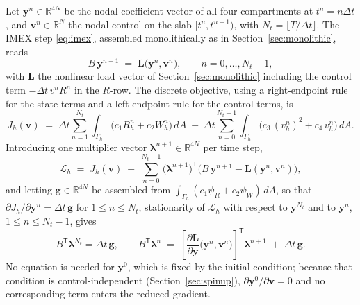 \documentclass[11pt]{article}
\newcommand{\Lag}{\mathcal{L}}
\begin{document}
Let $\mathbf{y}^n\in\mathbb{R}^{4N}$ be the nodal coefficient vector of all four compartments at $t^n=n\Delta t$, and $\mathbf{v}^n\in\mathbb{R}^{N}$ the nodal control on the slab $[t^n,t^{n+1})$, with $N_t = \lfloor T/\Delta t\rfloor$. The IMEX step \eqref{eq:imex}, assembled monolithically as in Section~\ref{sec:monolithic}, reads
\begin{equation}
B\,\mathbf{y}^{n+1} \;=\; \mathbf{L}\big(\mathbf{y}^n,\mathbf{v}^n\big), \qquad n=0,\dots,N_t-1,
\label{eq:discrete-state}
\end{equation}
with $\mathbf{L}$ the nonlinear load vector of Section~\ref{sec:monolithic} including the control term $-\Delta t\,v^n R^n$ in the $R$-row. The discrete objective, using a right-endpoint rule for the state terms and a left-endpoint rule for the control terms, is
\begin{equation}
J_h(\mathbf{v}) \;=\; \Delta t\sum_{n=1}^{N_t}\int_{\Gamma_h}\big(c_1 R_h^n + c_2 W_h^n\big)\,dA
\;+\; \Delta t\sum_{n=0}^{N_t-1}\int_{\Gamma_h} \big(c_3\,(v_h^n)^2 + c_4\,v_h^n\big)\,dA .
\label{eq:discrete-objective}
\end{equation}
Introducing one multiplier vector $\boldsymbol\lambda^{n+1}\in\mathbb{R}^{4N}$ per time step,
\begin{equation}
\Lag_h \;=\; J_h(\mathbf{v}) \;-\; \sum_{n=0}^{N_t-1}\big(\boldsymbol\lambda^{n+1}\big)^{\mathsf T}\Big(B\,\mathbf{y}^{n+1} - \mathbf{L}(\mathbf{y}^n,\mathbf{v}^n)\Big),
\end{equation}
and letting $\mathbf{g}\in\mathbb{R}^{4N}$ be assembled from $\int_{\Gamma_h}(c_1\psi_R + c_2\psi_W)\,dA$, so that $\partial J_h/\partial \mathbf{y}^n = \Delta t\,\mathbf{g}$ for $1\le n\le N_t$, stationarity of $\Lag_h$ with respect to $\mathbf{y}^{N_t}$ and to $\mathbf{y}^{n}$, $1\le n\le N_t-1$, gives
\begin{equation}
B^{\mathsf T}\boldsymbol\lambda^{N_t} = \Delta t\,\mathbf{g},
\qquad
B^{\mathsf T}\boldsymbol\lambda^{n} \;=\; \left[\frac{\partial \mathbf{L}}{\partial\mathbf{y}}\big(\mathbf{y}^n,\mathbf{v}^n\big)\right]^{\mathsf T}\boldsymbol\lambda^{n+1} \;+\; \Delta t\,\mathbf{g}.
\label{eq:discrete-adjoint}
\end{equation}
No equation is needed for $\mathbf{y}^0$, which is fixed by the initial condition; because that condition is control-independent (Section~\ref{sec:spinup}), $\partial\mathbf{y}^0/\partial\mathbf{v}=0$ and no corresponding term enters the reduced gradient.
\end{document}
